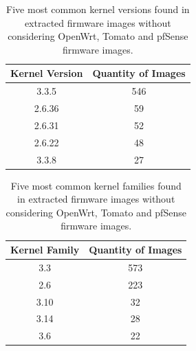 \begin{table}[H]
\centering
\caption{Five most common kernel versions found in extracted firmware images without considering OpenWrt, Tomato and pfSense firmware images.}
\begin{tabular}{|c|c|}
\hline
\textbf{Kernel Version} & \textbf{Quantity of Images} \\ \hline
3.3.5                  & 546                 \\ 
2.6.36                 &  59                 \\ 
2.6.31                 &  52                 \\ 
2.6.22                 &  48                 \\ 
3.3.8                  &  27                 \\ \hline
\end{tabular}
\label{tab:kernel-stats}
\end{table}

\begin{table}[H]
\centering
\caption{Five most common kernel families found in extracted firmware images without considering OpenWrt, Tomato and pfSense firmware images.}
\begin{tabular}{|c|c|}
\hline
\textbf{Kernel Family} & \textbf{Quantity of Images} \\ \hline
3.3                     & 573                \\
2.6                     & 223                \\
3.10                    &  32                \\
3.14                    &  28                \\
3.6                     &  22                \\ \hline
\end{tabular}
\label{tab:kernel-family-stats}
\end{table}


